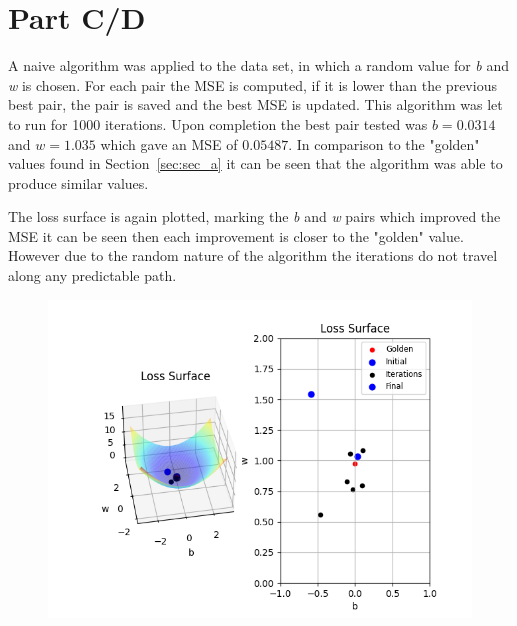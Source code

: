 \newpage
\section{Part C/D}
\label{sec:sec_cd}

A naive algorithm was applied to the data set, in which a random value for \textit{b} and \textit{w} is chosen. For each  pair the MSE is computed, if it is lower than the previous best pair, the pair is saved and the best MSE is updated. This algorithm was let to run for 1000 iterations. Upon completion the best pair tested was $b=0.0314$ and $w=1.035$ which gave an MSE of $0.05487$. In comparison to the "golden" values found in Section~\ref{sec:sec_a} it can be seen that the algorithm was able to produce similar values.

The loss surface is again plotted, marking the \textit{b} and \textit{w} pairs which improved the MSE it can be seen then each improvement is closer to the "golden" value. However due to the random nature of the algorithm the iterations do not travel along any predictable path.

\begin{figure}[htpb]
	\centering
	\includegraphics[width=\columnwidth]{figures/loss_surface_naive.png}
	\label{fig:loss_surface_naive}
\end{figure}

